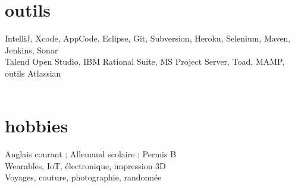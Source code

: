 \documentclass[hidelinks]{friggeri-cv} %
\begin{document}
\section{outils}

IntelliJ, Xcode, AppCode, Eclipse, Git, Subversion, Heroku, Selenium, Maven, Jenkins, Sonar\\
Talend Open Studio, IBM Rational Suite, MS Project Server, Toad, MAMP, outils Atlassian
\\
\\


\section{hobbies}

Anglais courant ; Allemand scolaire ; Permis B\\
Wearables, IoT, électronique, impression 3D\\
Voyages, couture, photographie, randonnée

\end{document}
